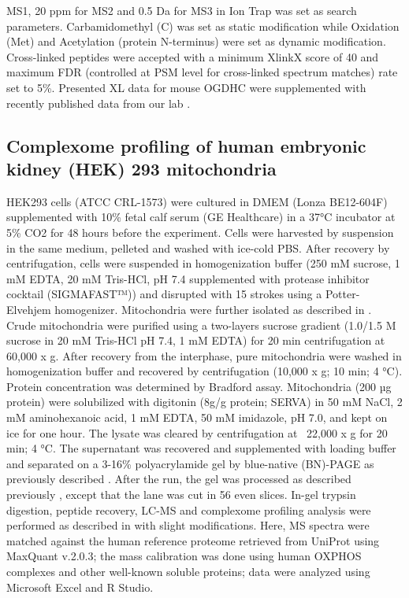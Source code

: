MS1, 20 ppm for MS2 and 0.5 Da for MS3 in Ion Trap was set as search parameters. Carbamidomethyl (C) was set as static modification while Oxidation (Met) and Acetylation (protein N-terminus) were set as dynamic modification. Cross-linked peptides were accepted with a minimum XlinkX score of 40 and maximum FDR (controlled at PSM level for cross-linked spectrum matches) rate set to 5\%. Presented XL data for mouse OGDHC were supplemented with recently published data from our lab \cite{Liu_2018}.
%
\subsection*{Complexome profiling of human embryonic kidney (HEK) 293 mitochondria}
HEK293 cells (ATCC CRL-1573) were cultured in DMEM (Lonza BE12-604F) supplemented with 10\% fetal calf serum (GE Healthcare) in a 37°C incubator at 5\% CO2 for 48 hours before the experiment. Cells were harvested by suspension in the same medium, pelleted and washed with ice-cold PBS. After recovery by centrifugation, cells were suspended in homogenization buffer (250 mM sucrose, 1 mM EDTA, 20 mM Tris-HCl, pH 7.4 supplemented with protease inhibitor cocktail (SIGMAFAST™)) and disrupted with 15 strokes using a Potter-Elvehjem homogenizer. Mitochondria were further isolated as described in \cite{Guerrero-Castillo_2017}. Crude mitochondria were purified using a two-layers sucrose gradient (1.0/1.5 M sucrose in 20 mM Tris-HCl pH 7.4, 1 mM EDTA) for 20 min centrifugation at 60,000 x g. After recovery from the interphase, pure mitochondria were washed in homogenization buffer and recovered by centrifugation (10,000 x g; 10 min; 4 °C). Protein concentration was determined by Bradford assay. Mitochondria (200 µg protein) were solubilized with digitonin (8g/g protein; SERVA) in 50 mM NaCl, 2 mM aminohexanoic acid, 1 mM EDTA, 50 mM imidazole, pH 7.0, and kept on ice for one hour. The lysate was cleared by centrifugation at ~22,000 x g for 20 min; 4 °C. The supernatant was recovered and supplemented with loading buffer and separated on a 3-16\% polyacrylamide gel by blue-native (BN)-PAGE as previously described \cite{Wittig_2006}. After the run, the gel was processed as described previously \cite{Evers_2021}, except that the lane was cut in 56 even slices. In-gel trypsin digestion, peptide recovery, LC-MS and complexome profiling analysis were performed as described in \cite{Evers_2021} with slight modifications. Here, MS spectra were matched against the human reference proteome retrieved from UniProt using MaxQuant v.2.0.3; the mass calibration was done using human OXPHOS complexes and other well-known soluble proteins; data were analyzed using Microsoft Excel and R Studio.
%
